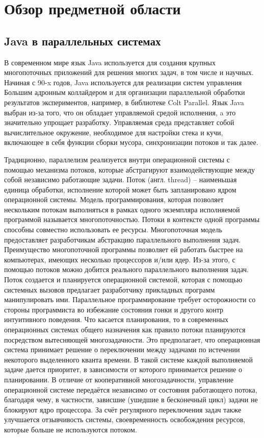 \section{Обзор предметной области}
	\subsection{Java в параллельных системах}
	В современном мире язык Java используется для создания крупных многопоточных приложений 
	для решения многих задач, в том числе и научных. Начиная с 90-x годов, Java используется для реализации
	систем управления Большим адронным коллайдером и для организации параллельной обработки результатов 
	экспериментов, например, в библиотеке Colt Parallel\cite{colt}. Язык Java выбран из-за того, что он 
	обладает управляемой средой исполнения, a это значительно упрощает разработку. Управляемая среда представляет
	собой вычислительное окружение, необходимое для настройки стека и кучи, включающее в себя функции сборки мусора,
	синхронизации потоков и так далее.
	\par
	Традиционно, параллелизм реализуется внутри операционной системы с помощью механизма потоков, 
	которые абстрагируют взаимодействующие между собой независимо работающие задачи. 
	Поток (англ. thread) -- наименьшая единица обработки, исполнение которой может 
	быть запланировано ядром операционной системы\cite{thread}. 
	Модель программирования, которая позволяет нескольким потокам выполняться в рамках одного экземпляра
	исполняемой программой называется многопоточностью. Потоки в контексте одной программы способны
	совместно использовать ее ресурсы. Многопоточная модель предоставляет
	разработчикам абстракцию параллельного выполнения задач. Преимущество многопоточной программы 
	позволяет ей работать быстрее на компьютерах, имеющих несколько процессоров и/или ядер. Из-за этого, с
	помощью потоков можно добится реального параллельного выполнения задач. Поток создается и планируется
	операционной системой, которая с помощью системных вызовов предлагает разработчику прикладных программ
	манипулировать ими. Параллельное программирование требует осторожности со стороны программиста во
	избежание состояния гонки и другого контр интуитивного поведения. 
	Что касается планирования, то в современных операционных системах общего назначения как правило потоки
	планируются посредством вытесняющей многозадачности. Это предполагает, что операционная система принимает
	решение о переключении между задачами по истечении некоторого выделенного кванта времени.
	В такой системе каждой выполняемой задаче дается приоритет, в зависимости от которого принимается решение
	о планировании. В отличие от кооперативной многозадачности, управление операционной системе передаётся
	независимо от состояния работающего потока, благодаря чему, в частности, зависшие (ушедшие в бесконечный цикл)
	задачи не блокируют ядро процессора. За счёт регулярного переключения задач 
	также улучшается отзывчивость системы, своевременность освобождения ресурсов, которые больше
	не используются потоком.
	
